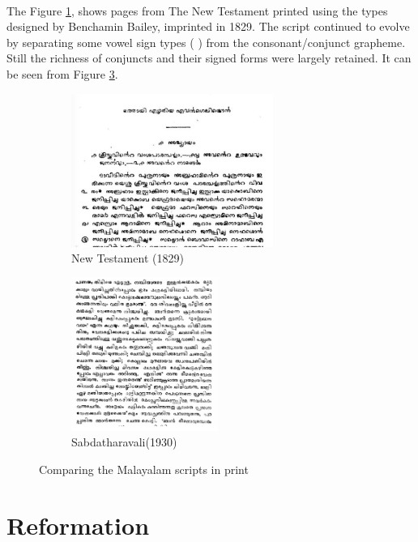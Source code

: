 \documentclass[10pt]{article}
\begin{document}
\paragraph{}
The Figure \ref{newtestament}, shows pages from The New Testament printed using the types designed by Benchamin Bailey, imprinted in 1829\cite{babucherian}. The script continued to evolve by separating some vowel sign types ({ }) from the consonant/conjunct grapheme. Still the richness of conjuncts and their signed forms were largely retained. It can be seen from Figure \ref{Sabdatharavali}. 


\begin{figure}[h!]
\begin{subfigure}{.5\textwidth}
 \centering
 \includegraphics[width=\linewidth, height=5cm]{images/newtestament1829.png}
 \caption{New Testament (1829)}
 \label{newtestament}
\end{subfigure}%
\begin{subfigure}{.5\textwidth}
 \centering
 \includegraphics[width=\linewidth,height=5cm]{images/1930-Sabdatharavali.png}
 \caption{Sabdatharavali(1930)}
 \label{Sabdatharavali}
\end{subfigure}
\caption{Comparing the Malayalam scripts in print}
\end{figure}


\section{Reformation}
\end{document}
